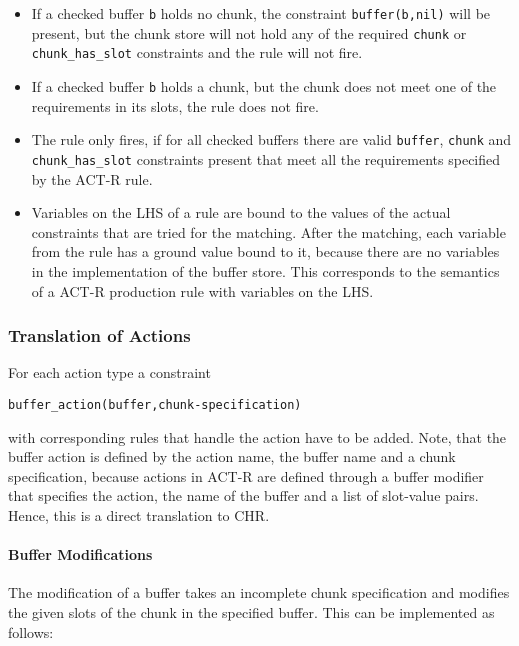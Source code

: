 \begin{itemize}
 \item If a checked buffer \verb|b| holds no chunk, the constraint \verb|buffer(b,nil)| will be present, but the chunk store will not hold any of the required \verb|chunk| or \verb|chunk_has_slot| constraints and the rule will not fire.
 \item If a checked buffer \verb|b| holds a chunk, but the chunk does not meet one of the requirements in its slots, the rule does not fire.
 \item The rule only fires, if for all checked buffers there are valid \verb|buffer|, \verb|chunk| and \verb|chunk_has_slot| constraints present that meet all the requirements specified by the ACT-R rule.
 \item Variables on the LHS of a rule are bound to the values of the actual constraints that are tried for the matching. After the matching, each variable from the rule has a ground value bound to it, because there are no variables in the implementation of the buffer store. This corresponds to the semantics of a ACT-R production rule with variables on the LHS.
\end{itemize}


\subsubsection{Translation of Actions}
\label{translation_of_actions}

For each action type a constraint

\begin{lstlisting}
buffer_action(buffer,chunk-specification)
\end{lstlisting}

with corresponding rules that handle the action have to be added. Note, that the buffer action is defined by the action name, the buffer name and a chunk specification, because actions in ACT-R are defined through a buffer modifier that specifies the action, the name of the buffer and a list of slot-value pairs. Hence, this is a direct translation to CHR.

\paragraph{Buffer Modifications}

The modification of a buffer takes an incomplete chunk specification and modifies the given slots of the chunk in the specified buffer. This can be implemented as follows:

